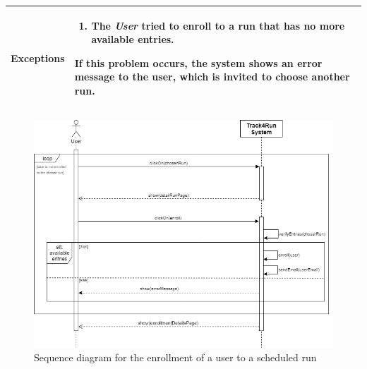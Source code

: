 \begin{table}[H]
\begin{tabular}{|p{3.5cm}|p{10.3cm}|}
    \hline
    \textbf{\large{Exceptions}} 		& \begin{enumerate}[leftmargin=0.5cm]
                                          	\item The \emph{User} tried to enroll to a run that has no more available entries.
                                          \end{enumerate}
    										If this problem occurs, the system shows an error message to the user, which is invited to choose another run.\\
    
    \hline
    
    \end{tabular}
	
\end{table}

\begin{figure}[H]
    \centering
    \includegraphics[scale=0.4]{Pictures/enrollSeqDiag.png}
    \caption{Sequence diagram for the enrollment of a user to a scheduled run}
\end{figure}
